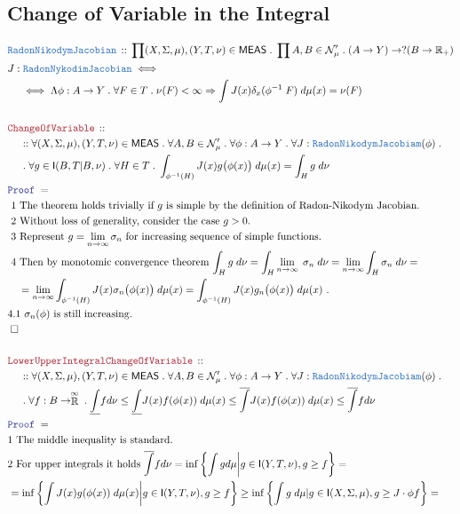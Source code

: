 \documentclass[12pt]{scrartcl}
\newcommand{\TYPE}[1]{\textcolor{NavyBlue}{\mathtt{#1}}}
\newcommand{\LOGIC}[1]{\textcolor{Blue}{\mathtt{#1}}}
\newcommand{\THM}[1]{\textcolor{Maroon}{\mathtt{#1}}}
\renewcommand{\.}{\; . \;}
\newcommand{\Theorem}[2]{& \THM{#1} \, :: \, #2 \\ & \Proof = \\ }
\newcommand{\DeclareType}[2]{& \TYPE{#1} \, :: \, #2 \\}
\newcommand{\DefineType}[3]{& #1 : \TYPE{#2} \iff #3 \\}
\newcommand{\NewLine}{\\ & \kern 1pc}
\newcommand{\Page}[1]{ \begin{align*} #1 \end{align*}   }
\newcommand{\Imply}{\Rightarrow}
\newcommand{\Reals}{\mathbb{R} }
\newcommand{\EReals}{\stackrel{\mathclap{\infty}}{\mathbb{R}}}
\newcommand{\QED}{\; \square}
\newcommand{\EndProof}{& \QED \\}
\newcommand{\Proof}{\LOGIC{Proof} \; }
\newcommand{\Explain}[1]{& \text{#1.} \\}
\newcommand{\ExplainFurther}[1]{& \text{#1} \\}
\newcommand{\Null}{\mathcal{N}}
\newcommand{\Integrable}{\mathsf{I}}
\newcommand{\MEAS}{\mathsf{MEAS}}
\begin{document}
\subsection{Change of Variable in the Integral}
\Page{
	\DeclareType{RadonNikodymJacobian}
	{
		\prod  (X,\Sigma,\mu),(Y,T,\nu)  \in \MEAS\.
		\prod A,B \in \Null'_\mu  \.
		(A \to Y) \to ?(B \to \Reals_+)
	}
	\DefineType{J}{RadonNykodimJacobian}
	{
		\NewLine \iff
		\Lambda \phi : A \to Y \. 		
		\forall F \in T \. 
		\nu(F) < \infty \Imply		
		\int J(x)  \delta_x(\phi^{-1} \; F) \; d\mu(x)  = \nu(F) 
	}
	\\	
	\Theorem{ChangeOfVariable}
	{
		\NewLine :: 		
		\forall (X,\Sigma,\mu),(Y,T,\nu) \in \MEAS \.
		\forall A,B \in \Null'_\mu \.
		\forall \phi : A \to Y \.
		\forall J : \TYPE{RadonNikodymJacobiam}(\phi) \.	\NewLine \.	
		\forall g \in \Integrable(B,T|B,\nu) \.
		\forall   H \in T \.
		\int_{\phi^{-1}(H)} J(x) g\big( \phi(x) \big) \; d\mu(x) = \int_H g \; d \nu
	}
	\Explain{ 1 The theorem holds trivially if $g$ is simple by the definition 
		of Radon-Nikodym Jacobian}
	\Explain{ 2 Without loss of generality, consider the case $g > 0$}
	\Explain{ 3  Represent $g = \lim_{n \to \infty} \sigma_n$ 
		for increasing sequence of simple functions}
	\ExplainFurther{ 4 Then by monotomic convergence theorem
		$
			\int_H g \; d\nu = 
			\int_H \lim_{n \to \infty} \; \sigma_n \; d\nu =
			\lim_{n \to \infty}\int_H  \sigma_n \; d\nu =$}
	\Explain{
			$ \quad =\lim_{n \to \infty}  \int_{\phi^{-1}(H)} J(x) \sigma_n\big( \phi(x) \big) \; d\mu(x)  =
			\int_{\phi^{-1}(H)} J(x) g_n\big( \phi(x) \big) \; d\mu(x) 
		$
	}
	\Explain{4.1 $\sigma_n(\phi)$ is still increasing}
	\EndProof
	\\
	\Theorem{LowerUpperIntegralChangeOfVariable}
	{
		\NewLine :: 		
		\forall (X,\Sigma,\mu),(Y,T,\nu) \in \MEAS \.
		\forall A,B \in \Null'_\mu \.
		\forall \phi : A \to Y \.
		\forall J : \TYPE{RadonNikodymJacobiam}(\phi) \.	\NewLine \.	
		\forall f : B \to \EReals \.
		\underline{\int} f d\nu \le \underline{\int} J(x) f(\phi(x)) \; d\mu(x)  \le
		\overline{\int} J(x)f(\phi(x)) \; d\mu(x) \le  \overline{\int} f d\nu 
	}
	\Explain{1 The middle inequality is standard}
	\ExplainFurther{2 For upper integrals it holds
			$ \overline{\int} f d\nu  =
				\inf  \left\{ \int g d\mu \bigg| g \in \Integrable(Y,T,\nu), g \ge f \right\}=  $}
	\ExplainFurther{ $= 
				 \inf  \left\{ \int  J(x)g(\phi(x)) \; d\mu(x) \bigg| g \in \Integrable(Y,T,\nu), g \ge f \right\}
			\ge \inf \left\{  \int g \; d\mu | g \in \Integrable(X,\Sigma,\mu), g \ge J \cdot \phi f    \right\}=$}
}
\end{document}
